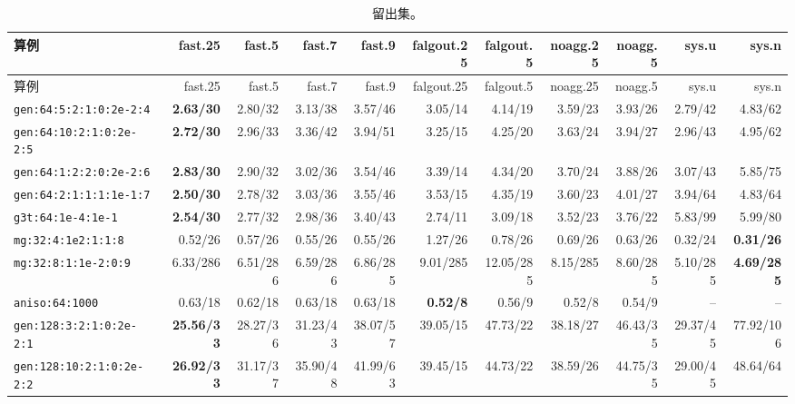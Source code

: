 {\tiny\setlength{\tabcolsep}{2.5pt}
\begin{longtable}{lrrrrrrrrrr}
\caption{留出集。}\\
\toprule
算例 & fast.25 & fast.5 & fast.7 & fast.9 & falgout.25 & falgout.5 & noagg.25 & noagg.5 & sys.u & sys.n \\
\midrule
\endfirsthead
\toprule
算例 & fast.25 & fast.5 & fast.7 & fast.9 & falgout.25 & falgout.5 & noagg.25 & noagg.5 & sys.u & sys.n \\
\midrule
\endhead
\bottomrule
\endlastfoot
\texttt{gen:64:5:2:1:0:2e-2:4} & \textbf{2.63/30} & 2.80/32 & 3.13/38 & 3.57/46 & 3.05/14 & 4.14/19 & 3.59/23 & 3.93/26 & 2.79/42 & 4.83/62 \\
\texttt{gen:64:10:2:1:0:2e-2:5} & \textbf{2.72/30} & 2.96/33 & 3.36/42 & 3.94/51 & 3.25/15 & 4.25/20 & 3.63/24 & 3.94/27 & 2.96/43 & 4.95/62 \\
\texttt{gen:64:1:2:2:0:2e-2:6} & \textbf{2.83/30} & 2.90/32 & 3.02/36 & 3.54/46 & 3.39/14 & 4.34/20 & 3.70/24 & 3.88/26 & 3.07/43 & 5.85/75 \\
\texttt{gen:64:2:1:1:1:1e-1:7} & \textbf{2.50/30} & 2.78/32 & 3.03/36 & 3.55/46 & 3.53/15 & 4.35/19 & 3.60/23 & 4.01/27 & 3.94/64 & 4.83/64 \\
\texttt{g3t:64:1e-4:1e-1} & \textbf{2.54/30} & 2.77/32 & 2.98/36 & 3.40/43 & 2.74/11 & 3.09/18 & 3.52/23 & 3.76/22 & 5.83/99 & 5.99/80 \\
\texttt{mg:32:4:1e2:1:1:8} & 0.52/26 & 0.57/26 & 0.55/26 & 0.55/26 & 1.27/26 & 0.78/26 & 0.69/26 & 0.63/26 & 0.32/24 & \textbf{0.31/26} \\
\texttt{mg:32:8:1:1e-2:0:9} & 6.33/286 & 6.51/286 & 6.59/286 & 6.86/285 & 9.01/285 & 12.05/285 & 8.15/285 & 8.60/285 & 5.10/285 & \textbf{4.69/285} \\
\texttt{aniso:64:1000} & 0.63/18 & 0.62/18 & 0.63/18 & 0.63/18 & \textbf{0.52/8} & 0.56/9 & 0.52/8 & 0.54/9 & -- & -- \\
\texttt{gen:128:3:2:1:0:2e-2:1} & \textbf{25.56/33} & 28.27/36 & 31.23/43 & 38.07/57 & 39.05/15 & 47.73/22 & 38.18/27 & 46.43/35 & 29.37/45 & 77.92/106 \\
\texttt{gen:128:10:2:1:0:2e-2:2} & \textbf{26.92/33} & 31.17/37 & 35.90/48 & 41.99/63 & 39.45/15 & 44.73/22 & 38.59/26 & 44.75/35 & 29.00/45 & 48.64/64 \\
\end{longtable}}
